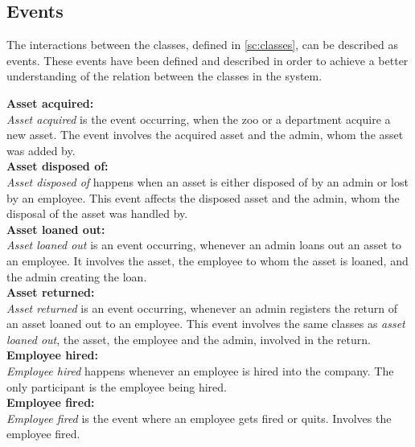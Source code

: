 \subsection{Events}\label{ssc:events}
The interactions between the classes, defined in \autoref{sc:classes}, can be described as events. These events have been defined and described in order to achieve a better understanding of the relation between the classes in the system.
\par

\textbf{Asset acquired:}\\
\textit{Asset acquired} is the event occurring, when the zoo or a department acquire a new asset. The event involves the acquired asset and the admin, whom the asset was added by.\\

\textbf{Asset disposed of:}\\
\textit{Asset disposed of} happens when an asset is either disposed of by an admin or lost by an employee. This event affects the disposed asset and the admin, whom the disposal of the asset was handled by.\\

\textbf{Asset loaned out:}\\
\textit{Asset loaned out} is an event occurring, whenever an admin loans out an asset to an employee. It involves the asset, the employee to whom the asset is loaned, and the admin creating the loan.\\

\textbf{Asset returned:}\\
\textit{Asset returned} is an event occurring, whenever an admin registers the return of an asset loaned out to an employee. This event involves the same classes as \textit{asset loaned out}, the asset, the employee and the admin, involved in the return.\\

\textbf{Employee hired:}\\
\textit{Employee hired} happens whenever an employee is hired into the company. The only participant is the employee being hired.\\

\textbf{Employee fired:}\\
\textit{Employee fired} is the event where an employee gets fired or quits. Involves the employee fired.\\

